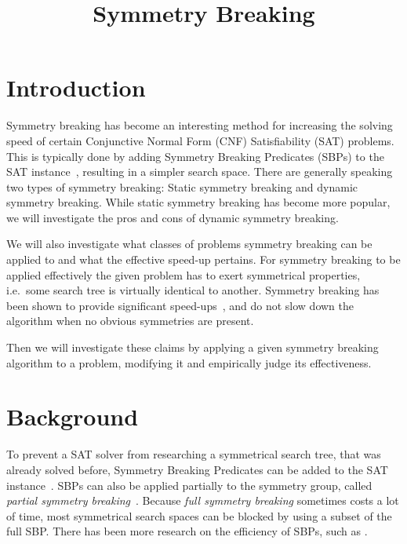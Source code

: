 

\title{Symmetry Breaking}


	\maketitle
	
	\listoftodos

	\begin{abstract}
	\end{abstract}
	
	\section{Introduction} \label{sec:Introduction}
		Symmetry breaking has become an interesting method for increasing the solving speed of certain Conjunctive Normal Form (CNF) Satisfiability (SAT) problems.
		This is typically done by adding Symmetry Breaking Predicates (SBPs) to the SAT instance~\cite{sakallah2009symmetry},
		resulting in a simpler search space.
		There are generally speaking two types of symmetry breaking: Static symmetry breaking and dynamic symmetry breaking.
		While static symmetry breaking has become more popular, we will investigate the pros and cons of dynamic symmetry breaking.
		
		We will also investigate what classes of problems symmetry breaking can be applied to and what the effective speed-up pertains.
		For symmetry breaking to be applied effectively the given problem has to exert symmetrical properties,
		i.e.\ some search tree is virtually identical to another.
		Symmetry breaking has been shown to provide significant speed-ups~\cite{darga2004exploiting,aloul2003solving},
		and do not slow down the algorithm when no obvious symmetries are present.
		
		Then we will investigate these claims by applying a given symmetry breaking algorithm to a problem, modifying it and empirically judge its effectiveness. 
		
	\section{Background} \label{sec:Background}
		To prevent a SAT solver from researching a symmetrical search tree, that was already solved before,
		Symmetry Breaking Predicates can be added to the SAT instance~\cite{sakallah2009symmetry}.		
		SBPs can also be applied partially to the symmetry group, called \textit{partial symmetry breaking}~\cite{sakallah2009symmetry}.
		Because \textit{full symmetry breaking} sometimes costs a lot of time, most symmetrical search spaces can be blocked by using a subset of the full SBP.
		There has been more research on the efficiency of SBPs, such as \cite{aloul2006efficient}.
		
